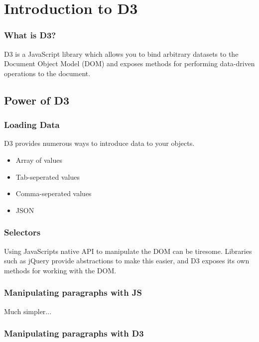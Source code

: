 \documentclass[red]{beamer}
\begin{document}
\begin{frame}
  \titlepage
\end{frame}

\section[Outline]{}

\section{Introduction to D3}

\begin{frame}
    \frametitle{What is D3?}
    D3 is a JavaScript library which allows you to bind arbitrary datasets to 
    the Document Object Model (DOM) and exposes methods for performing data-driven operations to the document.  
\end{frame}


\subsection{Power of D3}

\begin{frame}
  \frametitle{Loading Data}   %
  D3 provides numerous ways to introduce data to your objects. 
  \begin{itemize}
  \item<1-> Array of values
  \item<2-> Tab-seperated values
  \item<3-> Comma-seperated values
  \item<4-> JSON
  \end{itemize}
\end{frame}

\begin{frame}
	\frametitle{Selectors}
    Using JavaScripts native API to manipulate the DOM can be tiresome. Libraries such as jQuery provide abstractions to make this easier, and D3 exposes its own methods for working with the DOM. 

\end{frame}

\begin{frame}
 	\frametitle{Manipulating paragraphs with JS}
		\lstll
\end{frame}

\begin{frame}
    Much simpler...
    \frametitle{Manipulating paragraphs with D3}
    \lstlll
\end{frame}
\end{document}
